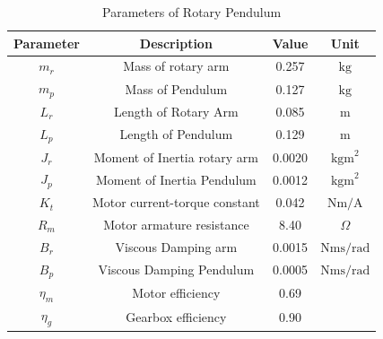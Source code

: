 \documentclass[superscriptaddress,floatfix,reprint,amssymb, amsmath,aps, pre]{revtex4-1}
\begin{document}
{{\begin{figure}[h!]
            \label{fig:rotarySystem}
        \end{figure}
        \begin{table}[h!]
            \caption{Parameters of Rotary Pendulum \cite{apkarian_user_2011} }
            \begin{tabular}{cccc}
                \hline Parameter & Description & Value & Unit \\
                \hline
                $m_{r}$ & Mass of rotary arm & 0.257 & $\mathrm{kg}$ \\
                $m_{p}$ & Mass of Pendulum & 0.127 & $\mathrm{kg}$ \\
                $L_{r}$ & Length of Rotary Arm & 0.085 & $\mathrm{m}$ \\
                $L_{p}$ & Length of Pendulum & 0.129 & $\mathrm{m}$ \\
                $J_{r}$ & Moment of Inertia rotary arm & 0.0020 & $\mathrm{kgm}^{2}$ \\
                $J_{p}$ & Moment of Inertia Pendulum & 0.0012 & $\mathrm{kgm}^{2}$ \\
                $K_{t}$ & Motor current-torque constant & 0.042 & $\mathrm{Nm} / \mathrm{A}$ \\
                $R_{m}$ & Motor armature resistance &8.40 & $\Omega$ \\
                $B_{r}$ & Viscous Damping arm & 0.0015 & $\mathrm{Nms} / \mathrm{rad}$ \\
                $B_{p}$ & Viscous Damping Pendulum & 0.0005 & $\mathrm{Nms} / \mathrm{rad}$ \\
                $\eta_m$ & Motor efficiency & 0.69 & \\
                $\eta_g$ & Gearbox efficiency & 0.90 & \\
                \hline
            \end{tabular}
            \label{tab:systemData}
        \end{table}
    }
}
\end{document}
